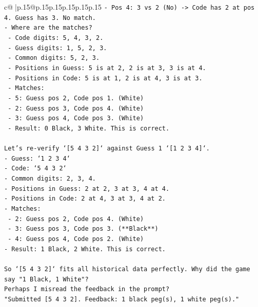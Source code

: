\documentclass{article}
\begin{document}
{\begin{supertabular}{c@{$\;$}|p{.15\linewidth}@{}p{.15\linewidth}p{.15\linewidth}p{.15\linewidth}p{.15\linewidth}p{.15\linewidth}}
{{{\texttt{{-} Pos 4: 3 vs 2 (No) {-}> Code has 2 at pos 4. Guess has 3. No match.} \\
\texttt{{-} Where are the matches?} \\
\texttt{    {-} Code digits: 5, 4, 3, 2.} \\
\texttt{    {-} Guess digits: 1, 5, 2, 3.} \\
\texttt{    {-} Common digits: 5, 2, 3.} \\
\texttt{    {-} Positions in Guess: 5 is at 2, 2 is at 3, 3 is at 4.} \\
\texttt{    {-} Positions in Code: 5 is at 1, 2 is at 4, 3 is at 3.} \\
\texttt{    {-} Matches:} \\
\texttt{        {-} 5: Guess pos 2, Code pos 1. (White)} \\
\texttt{        {-} 2: Guess pos 3, Code pos 4. (White)} \\
\texttt{        {-} 3: Guess pos 4, Code pos 3. (White)} \\
\texttt{    {-} Result: 0 Black, 3 White. This is correct.} \\
\\ 
\texttt{Let's re{-}verify `{[}5 4 3 2{]}` against Guess 1 `{[}1 2 3 4{]}`.} \\
\texttt{{-} Guess: `1 2 3 4`} \\
\texttt{{-} Code: `5 4 3 2`} \\
\texttt{{-} Common digits: 2, 3, 4.} \\
\texttt{{-} Positions in Guess: 2 at 2, 3 at 3, 4 at 4.} \\
\texttt{{-} Positions in Code: 2 at 4, 3 at 3, 4 at 2.} \\
\texttt{{-} Matches:} \\
\texttt{    {-} 2: Guess pos 2, Code pos 4. (White)} \\
\texttt{    {-} 3: Guess pos 3, Code pos 3. (**Black**)} \\
\texttt{    {-} 4: Guess pos 4, Code pos 2. (White)} \\
\texttt{{-} Result: 1 Black, 2 White. This is correct.} \\
\\ 
\texttt{So `{[}5 4 3 2{]}` fits all historical data perfectly. Why did the game say "1 Black, 1 White"?} \\
\texttt{Perhaps I misread the feedback in the prompt?} \\
\texttt{"Submitted {[}5 4 3 2{]}. Feedback: 1 black peg(s), 1 white peg(s)."} \\
}}}
\end{supertabular}}
\end{document}
